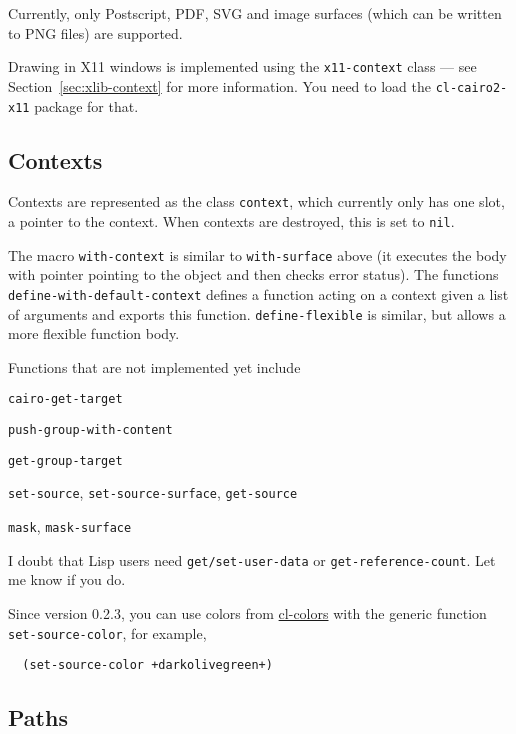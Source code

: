 \documentclass[12pt,letterpaper]{article}
\begin{document}
Currently, only Postscript, PDF, SVG and image surfaces (which can be
written to PNG files) are supported.

Drawing in X11 windows is implemented using the
\lstinline!x11-context! class --- see Section~\ref{sec:xlib-context}
for more information.  You need to load the \lstinline!cl-cairo2-x11!
package for that.

\subsection{Contexts}
\label{sec:contexts}

Contexts are represented as the class \lstinline!context!, which
currently only has one slot, a pointer to the context.  When contexts
are destroyed, this is set to \lstinline!nil!.

The macro \lstinline!with-context! is similar to
\lstinline!with-surface! above (it executes the body with pointer
pointing to the object and then checks error status).  The functions
\lstinline!define-with-default-context! defines a function acting on a
context given a list of arguments and exports this function.
\lstinline!define-flexible! is similar, but allows a more flexible
function body.

Functions that are not implemented yet include
\begin{compactitem}
  \item \lstinline!cairo-get-target!
  \item \lstinline!push-group-with-content!
  \item \lstinline!get-group-target!
  \item \lstinline!set-source!, \lstinline!set-source-surface!,
    \lstinline!get-source!
  \item \lstinline!mask!, \lstinline!mask-surface!
\end{compactitem}
I doubt that Lisp users need \lstinline!get/set-user-data! or
\lstinline!get-reference-count!.  Let me know if you do.

Since version 0.2.3, you can use colors from
\href{http://www.cliki.net/cl-colors}{cl-colors} with the generic
function \lstinline!set-source-color!, for example,
\begin{lstlisting}
  (set-source-color +darkolivegreen+)
\end{lstlisting}


\subsection{Paths}
\label{sec:paths}
\end{document}
